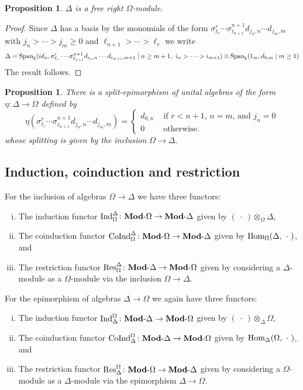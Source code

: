 \documentclass[a4paper,11pt]{amsart}
\newtheorem{proposition}[theorem]{Proposition}
\theoremstyle{definition}
\newcommand{\rmod}[1]{\text{{\bf Mod}-}{#1}}
\newcommand{\Span}{\text{\rm Span}}
\newcommand{\Ind}{\text{\rm Ind}}
\newcommand{\Res}{\text{\rm Res}}
\newcommand{\Hom}{\text{\rm Hom}}
\newcommand{\CoInd}{\text{\rm CoInd}}
\newcommand{\Simp}{{\Delta}}
\newcommand{\Diff}{{\Omega}}
\begin{document}
\begin{proposition}
  $\Simp$ is a free right $\Diff$-module.
\end{proposition}

\begin{proof}
  Since $\Simp$ has a basis by the monomials of the form $\sigma^r_{\ell_r}\cdots \sigma^{n+1}_{\ell_{n+1}}d_{j_n,n}\cdots d_{j_m,m}$ with $j_n>\cdots>j_m\geq 0$ and $\ell_{n+1} >\cdots > \ell_r$ we write
  \[ \Simp = \Span_{\Bbbk}(id_n,\sigma^r_{\ell_r}\cdots \sigma^{n+1}_{\ell_{n+1}}d_{i_n,n}\cdots d_{i_{m+1},m+1}\mid n\geq m+1,\ i_n>\cdots> i_{m+1})\otimes \Span_\Bbbk(1_m, d_{0,m}\mid m\geq 1)  \]
  The result follows.
\end{proof}

\begin{proposition}
    There is a split-epimorphism of unital algebras of the form $\eta\colon \Simp\to \Diff$ defined by
    \[ \eta(\sigma^r_{\ell_r}\cdots \sigma^{n+1}_{\ell_{n+1}}d_{j_n,n}\cdots d_{j_m,m}) = 
       \begin{cases}
          d_{0,n} & \text{ if $r<n+1$, $n=m$, and $j_n=0$}\\
          0 & \text{ otherwise.}
       \end{cases}
    \]
    whose splitting is given by the inclusion $\Diff\to\Simp$.
\end{proposition}

\subsection{Induction, coinduction and restriction}

For the inclusion of algebras $\Diff\to \Simp $ we have three functors: 
\begin{enumerate}[(i)]
    \item The induction functor $\Ind_{\Diff}^{\Simp }\colon \rmod{\Diff}\to\rmod{\Simp }$ given by $(\ \cdot\ )\otimes_{\Diff}\Simp $,
    \item The coinduction functor $\CoInd_{\Diff}^{\Simp }\colon \rmod{\Diff}\to\rmod{\Simp }$ given by $\Hom_{\Diff}(\Simp,\ \cdot\ )$, and 
    \item The restriction functor $\Res_{\Diff}^{\Simp}\colon \rmod{\Simp}\to\rmod{\Diff}$ given by considering a $\Simp$-module as a $\Diff$-module via the inclusion $\Diff\to \Simp$.
\end{enumerate}
For the epimorphism of algebras $\Simp\to \Diff$ we again have three functors: 
\begin{enumerate}[(i)]
    \item The induction functor $\Ind_{\Simp}^{\Diff}\colon \rmod{\Simp}\to\rmod{\Diff}$ given by $(\ \cdot\ )\otimes_{\Simp}\Diff$,
    \item The coinduction functor $\CoInd_{\Simp}^{\Diff}\colon \rmod{\Simp}\to\rmod{\Diff}$ given by $\Hom_{\Simp}(\Diff,\ \cdot\ )$, and 
    \item The restriction functor $\Res_{\Simp}^{\Diff}\colon \rmod{\Diff}\to\rmod{\Simp}$ given by considering a $\Diff$-module as a $\Simp$-module via the epimorphism $\Simp\to \Diff$.
\end{enumerate}
\end{document}
